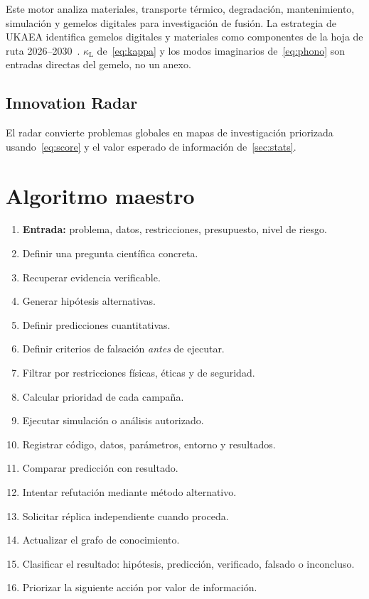 \documentclass[11pt,a4paper]{article}
\begin{document}
Este motor analiza materiales, transporte térmico, degradación, mantenimiento, simulación y gemelos digitales para investigación de fusión. La estrategia de UKAEA identifica gemelos digitales y materiales como componentes de la hoja de ruta 2026--2030~\cite{ukaea_strategy}. $\kappa_{\mathrm{L}}$ de~\eqref{eq:kappa} y los modos imaginarios de~\eqref{eq:phono} son entradas directas del gemelo, no un anexo.

\subsection{Innovation Radar}

El radar convierte problemas globales en mapas de investigación priorizada usando~\eqref{eq:score} y el valor esperado de información de~\cref{sec:stats}.

\section{Algoritmo maestro}
\label{sec:algo}

\begin{campbox}
\begin{enumerate}[leftmargin=1.4em,itemsep=2pt]
    \item \textbf{Entrada:} problema, datos, restricciones, presupuesto, nivel de riesgo.
    \item Definir una pregunta científica concreta.
    \item Recuperar evidencia verificable.
    \item Generar hipótesis alternativas.
    \item Definir predicciones cuantitativas.
    \item Definir criterios de falsación \emph{antes} de ejecutar.
    \item Filtrar por restricciones físicas, éticas y de seguridad.
    \item Calcular prioridad de cada campaña.
    \item Ejecutar simulación o análisis autorizado.
    \item Registrar código, datos, parámetros, entorno y resultados.
    \item Comparar predicción con resultado.
    \item Intentar refutación mediante método alternativo.
    \item Solicitar réplica independiente cuando proceda.
    \item Actualizar el grafo de conocimiento.
    \item Clasificar el resultado: hipótesis, predicción, verificado, falsado o inconcluso.
    \item Priorizar la siguiente acción por valor de información.
\end{enumerate}
\end{campbox}
\end{document}
